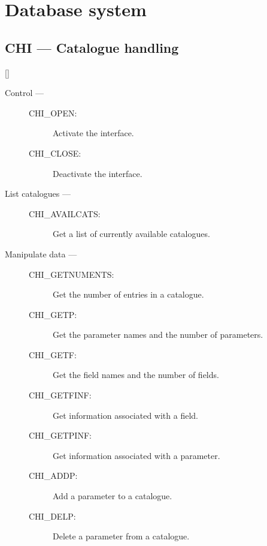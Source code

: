 \newpage

\section{Database system}

\subsection{CHI --- Catalogue handling}

\vspace{-9mm}

\hfill []

\vspace{2mm}

\begin{description}

\item [Control ---]

\begin{description}
\item [CHI\_OPEN:]  Activate the interface.
\item [CHI\_CLOSE:]  Deactivate the interface.
\end{description}

\item [List catalogues ---]

\begin{description}
\item [CHI\_AVAILCATS:]   Get a list of currently available catalogues.
\end{description}

\item [Manipulate data ---]

\begin{description}
\item [CHI\_GETNUMENTS:]  Get the number of entries in a catalogue.
\item [CHI\_GETP:]  Get the parameter names and the number of parameters.
\item [CHI\_GETF:]  Get the field names and the number of fields.
\item [CHI\_GETFINF:]  Get information associated with a field.
\item [CHI\_GETPINF:]  Get information associated with a parameter.
\item [CHI\_ADDP:]  Add a parameter to a catalogue.
\item [CHI\_DELP:]  Delete a parameter from a catalogue.
\end{description}


\end{description}
